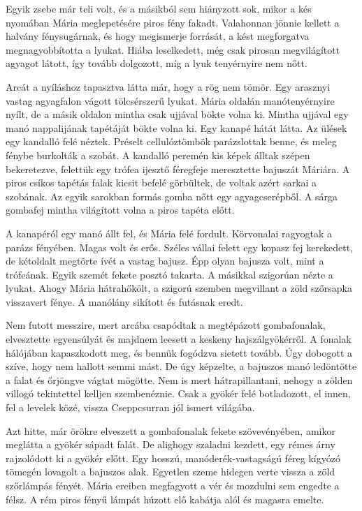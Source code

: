 \documentclass[10pt]{memoir}
\begin{document}
Egyik zsebe már teli volt, és a másikból sem hiányzott sok, mikor a kés
nyomában Mária meglepetésére piros fény fakadt. Valahonnan jönnie kellett a
halvány fénysugárnak, és hogy megismerje forrását, a kést megforgatva
megnagyobbította a lyukat. Hiába leselkedett, még csak pirosan megvilágított
agyagot látott, így tovább dolgozott, míg a lyuk tenyérnyire nem nőtt.

Arcát a nyíláshoz tapasztva látta már, hogy a rög nem tömör. Egy arasznyi
vastag agyagfalon vágott tölcsérszerű lyukat. Mária oldalán manótenyérnyire
nyílt, de a másik oldalon mintha csak ujjával bökte volna ki. Mintha ujjával
egy manó nappalijának tapétáját bökte volna ki. Egy kanapé hátát látta. Az
ülések egy kandalló felé néztek. Préselt cellulóztömbök parázslottak benne, és
meleg fénybe burkolták a szobát. A kandalló peremén kis képek álltak szépen
bekeretezve, felettük egy trófea ijesztő féregfeje meresztette bajuszát
Máriára. A piros csíkos tapétás falak kicsit befelé görbültek, de voltak azért
sarkai a szobának. Az egyik sarokban formás gomba nőtt egy agyagcserépből. A
sárga gombafej mintha világított volna a piros tapéta előtt.

A kanapéról egy manó állt fel, és Mária felé fordult. Körvonalai ragyogtak a
parázs fényében. Magas volt és erős. Széles vállai felett egy kopasz fej
kerekedett, de kétoldalt megtörte ívét a vastag bajusz. Épp olyan bajusza volt,
mint a trófeának. Egyik szemét fekete posztó takarta. A másikkal szigorúan
nézte a lyukat. Ahogy Mária hátrahőkölt, a szigorú szemben megvillant a zöld
szőrsapka visszavert fénye. A manólány sikított és futásnak eredt.

Nem futott messzire, mert arcába csapódtak a megtépázott gombafonalak,
elvesztette egyensúlyát és majdnem leesett a keskeny hajszálgyökérről. A
fonalak hálójában kapaszkodott meg, és bennük fogódzva sietett tovább. Úgy
dobogott a szíve, hogy nem hallott semmi mást. De úgy képzelte, a bajuszos manó
ledöntötte a falat és őrjöngve vágtat mögötte. Nem is mert hátrapillantani,
nehogy a zölden villogó tekintettel kelljen szembenéznie. Csak a gyökér felé
botladozott, el innen, fel a levelek közé, vissza Cseppcsurran jól ismert
világába.

Azt hitte, már örökre elveszett a gombafonalak fekete szövevényében, amikor
meglátta a gyökér sápadt falát. De alighogy szaladni kezdett, egy rémes árny
rajzolódott ki a gyökér előtt. Egy hosszú, manóderék-vastagságú féreg kígyózó
tömegén lovagolt a bajuszos alak. Egyetlen szeme hidegen verte vissza a zöld
szőrlámpás fényét. Mária ereiben megfagyott a vér és mozdulni sem engedte a
félsz. A rém piros fényű lámpát húzott elő kabátja alól és magasra emelte.
\end{document}
